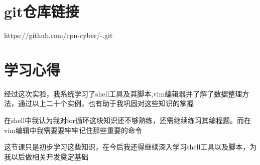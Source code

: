 \documentclass[a4paper, 12pt]{article}
\begin{document}
    \section{git仓库链接}
    https://github.com/cpn-cyber/-.git
    \section{学习心得}
    经过这次实验，我系统学习了shell工具及其脚本,vim编辑器并了解了数据整理方法，通过以上二十个实例，也有助于我巩固对这些知识的掌握
    \par
    在shell中我认为我对for循环这块知识还不够熟练，还需继续练习其编程题。而在vim编辑中我需要要牢牢记住那些重要的命令
    \par
    这节课只是初步学习这些知识，在今后我还得继续深入学习shell工具以及脚本，为我以后做相关开发奠定基础
  
\end{document}
